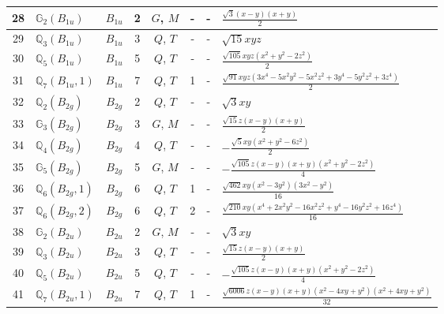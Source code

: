 \documentclass[fleqn,10pt,landscape]{jsarticle}
\begin{document}
\begin{longtable}[l]{clcccccl}
28 & $\mathbb{G}_{2}(B_{1u})$ & $B_{1u}$ & 2 & $G$, $M$ & - & - & $\frac{\sqrt{3} \left(x - y\right) \left(x + y\right)}{2}$ \\ \hline
29 & $\mathbb{Q}_{3}(B_{1u})$ & $B_{1u}$ & 3 & $Q$, $T$ & - & - & $\sqrt{15} x y z$ \\ \hline
30 & $\mathbb{Q}_{5}(B_{1u})$ & $B_{1u}$ & 5 & $Q$, $T$ & - & - & $\frac{\sqrt{105} x y z \left(x^{2} + y^{2} - 2 z^{2}\right)}{2}$ \\ \hline
31 & $\mathbb{Q}_{7}(B_{1u},1)$ & $B_{1u}$ & 7 & $Q$, $T$ & 1 & - & $\frac{\sqrt{91} x y z \left(3 x^{4} - 5 x^{2} y^{2} - 5 x^{2} z^{2} + 3 y^{4} - 5 y^{2} z^{2} + 3 z^{4}\right)}{2}$ \\ \hline
32 & $\mathbb{Q}_{2}(B_{2g})$ & $B_{2g}$ & 2 & $Q$, $T$ & - & - & $\sqrt{3} x y$ \\ \hline
33 & $\mathbb{G}_{3}(B_{2g})$ & $B_{2g}$ & 3 & $G$, $M$ & - & - & $\frac{\sqrt{15} z \left(x - y\right) \left(x + y\right)}{2}$ \\ \hline
34 & $\mathbb{Q}_{4}(B_{2g})$ & $B_{2g}$ & 4 & $Q$, $T$ & - & - & $- \frac{\sqrt{5} x y \left(x^{2} + y^{2} - 6 z^{2}\right)}{2}$ \\ \hline
35 & $\mathbb{G}_{5}(B_{2g})$ & $B_{2g}$ & 5 & $G$, $M$ & - & - & $- \frac{\sqrt{105} z \left(x - y\right) \left(x + y\right) \left(x^{2} + y^{2} - 2 z^{2}\right)}{4}$ \\ \hline
36 & $\mathbb{Q}_{6}(B_{2g},1)$ & $B_{2g}$ & 6 & $Q$, $T$ & 1 & - & $\frac{\sqrt{462} x y \left(x^{2} - 3 y^{2}\right) \left(3 x^{2} - y^{2}\right)}{16}$ \\ \hline
37 & $\mathbb{Q}_{6}(B_{2g},2)$ & $B_{2g}$ & 6 & $Q$, $T$ & 2 & - & $\frac{\sqrt{210} x y \left(x^{4} + 2 x^{2} y^{2} - 16 x^{2} z^{2} + y^{4} - 16 y^{2} z^{2} + 16 z^{4}\right)}{16}$ \\ \hline
38 & $\mathbb{G}_{2}(B_{2u})$ & $B_{2u}$ & 2 & $G$, $M$ & - & - & $\sqrt{3} x y$ \\ \hline
39 & $\mathbb{Q}_{3}(B_{2u})$ & $B_{2u}$ & 3 & $Q$, $T$ & - & - & $\frac{\sqrt{15} z \left(x - y\right) \left(x + y\right)}{2}$ \\ \hline
40 & $\mathbb{Q}_{5}(B_{2u})$ & $B_{2u}$ & 5 & $Q$, $T$ & - & - & $- \frac{\sqrt{105} z \left(x - y\right) \left(x + y\right) \left(x^{2} + y^{2} - 2 z^{2}\right)}{4}$ \\ \hline
41 & $\mathbb{Q}_{7}(B_{2u},1)$ & $B_{2u}$ & 7 & $Q$, $T$ & 1 & - & $\frac{\sqrt{6006} z \left(x - y\right) \left(x + y\right) \left(x^{2} - 4 x y + y^{2}\right) \left(x^{2} + 4 x y + y^{2}\right)}{32}$ \\ \hline

\end{longtable}
\end{document}

